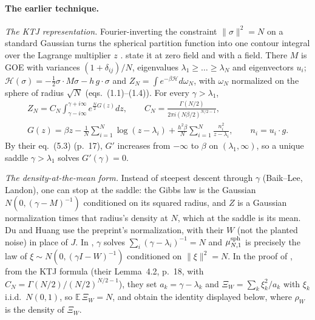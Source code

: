 \documentclass[11pt]{article}
\newcommand{\E}{\mathbb{E}}
\newcommand{\norm}[1]{\lVert #1\rVert}
\newcommand{\sloc}[2]{\cite[#2]{#1}}
\begin{document}
\paragraph{The earlier technique.}
\emph{The KTJ representation.} Fourier-inverting the constraint
$\norm\sigma^2=N$ on a standard Gaussian turns the spherical partition
function into one contour integral over the Lagrange multiplier $z$
\cite{NL-KosterlitzThoulessJones1976}.
\sloc{BaikLee2015-FluctuationsSphericalSKFreeEnergy}{Lemma~1.3, p.~5} state
it at zero field and
\sloc{BaikEtAl2020-SphericalSpinGlassExternalField}{Lemma~3.1, p.~11} with
a field. There $M$ is GOE with variances $(1+\delta_{ij})/N$, eigenvalues
$\lambda_1\ge\dots\ge\lambda_N$ and eigenvectors $u_i$;
$\mathcal H(\sigma)=-\frac12\sigma\cdot M\sigma-h\,g\cdot\sigma$ and
$Z_N=\int e^{-\beta\mathcal H}d\omega_N$, with $\omega_N$ normalized on the
sphere of radius $\sqrt N$ (eqs.~(1.1)--(1.4)). For every $\gamma>\lambda_1$,
\begin{gather*}
 Z_N=C_N\int_{\gamma-i\infty}^{\gamma+i\infty}e^{\frac N2G(z)}dz,\qquad
 C_N=\frac{\Gamma(N/2)}{2\pi i(N\beta/2)^{N/2-1}},\\
 G(z)=\beta z-\frac1N\sum_{i=1}^N\log(z-\lambda_i)+\frac{h^2\beta}N\sum_{i=1}^N\frac{n_i^2}{z-\lambda_i},
 \qquad n_i=u_i\cdot g .
\end{gather*}
By their eq.~(5.3) (p.~17), $G'$ increases from $-\infty$ to $\beta$ on
$(\lambda_1,\infty)$, so a unique saddle $\gamma>\lambda_1$ solves
$G'(\gamma)=0$.

\emph{The density-at-the-mean form.} Instead of steepest descent through
$\gamma$ (Baik--Lee, Landon), one can stop at the saddle: the Gibbs law is the Gaussian $N(0,(\gamma-M)^{-1})$ conditioned on its
squared radius, and $Z$ is a Gaussian normalization times that radius's
density at $N$, which at the saddle is its mean. Du and Huang use the
preprint's normalization, with their $W$ (not the planted noise) in place
of $J$. In
\sloc{DuHuang2026-CriticalSKOverlapDistribution}{\S1.2, eq.~(1.7), pp.~4--5},
$\gamma$ solves $\sum_i(\gamma-\lambda_i)^{-1}=N$ and $\mu^{\rm sph}_{N,1}$
is precisely the law of $\xi\sim N(0,(\gamma I-W)^{-1})$ conditioned on
$\norm\xi^2=N$. In the proof of
\sloc{DuHuang2026-CriticalSKFreeEnergyFluctuations}{Prop.~4.4, p.~22}, from
the KTJ formula (their Lemma~4.2, p.~18, with
$C_N=\Gamma(N/2)/(N/2)^{N/2-1}$), they set $a_k=\gamma-\lambda_k$ and
$\Xi_W=\sum_k\xi_k^2/a_k$ with $\xi_k$ i.i.d.\ $N(0,1)$, so
$\E\,\Xi_W=N$, and obtain the identity displayed below, where $\rho_W$ is
the density of $\Xi_W$.
\end{document}
